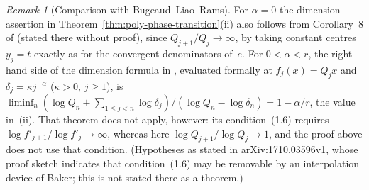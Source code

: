 \documentclass[11pt]{article}
\theoremstyle{definition}
\theoremstyle{remark}
\newtheorem{remark}[theorem]{Remark}
\begin{document}
\begin{remark}[Comparison with Bugeaud--Liao--Rams]\label{rem:poly-BLR}
For $\alpha=0$ the dimension assertion in Theorem~\ref{thm:poly-phase-transition}(ii)
also follows from Corollary~8 of \cite{BLR} (stated there without proof), since
$Q_{j+1}/Q_j\to\infty$, by taking
constant centres $y_j=t$ exactly as for the convergent denominators of~$e$.
For $0<\alpha<r$, the right-hand side of the dimension formula in
\cite[Theorem~7]{BLR}, evaluated formally at $f_j(x)=Q_jx$ and $\delta_j=\kappa j^{-\alpha}$ ($\kappa>0$, $j\ge1$),
is $\liminf_n(\log Q_n+\sum_{1\le j<n}\log\delta_j)/(\log Q_n-\log\delta_n)=1-\alpha/r$,
the value in~(ii). That theorem does not apply, however: its condition~(1.6) requires
$\log f'_{j+1}/\log f'_j\to\infty$, whereas here $\log Q_{j+1}/\log Q_j\to1$, and the
proof above does not use that condition. (Hypotheses as stated in arXiv:1710.03596v1, whose proof sketch indicates that
condition~(1.6) may be removable by an interpolation device of Baker; this is not
stated there as a theorem.)
\end{remark}
\end{document}
